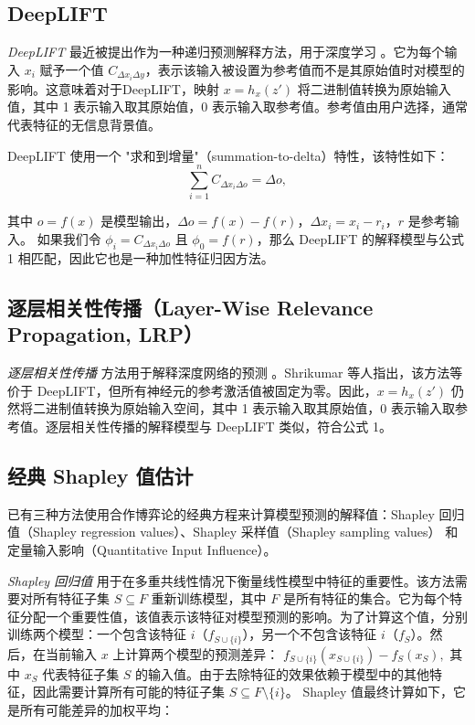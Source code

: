 \documentclass[12pt, a4paper]{ctexart} %
\begin{document}
\subsection{DeepLIFT}
\textit{DeepLIFT} 最近被提出作为一种递归预测解释方法，用于深度学习 。它为每个输入 $x_i$ 赋予一个值 $C_{\Delta x_i \Delta y}$，表示该输入被设置为参考值而不是其原始值时对模型的影响。这意味着对于DeepLIFT，映射 $x = h_x(z')$ 将二进制值转换为原始输入值，其中 1 表示输入取其原始值，0 表示输入取参考值。参考值由用户选择，通常代表特征的无信息背景值。

DeepLIFT 使用一个 "求和到增量"（summation-to-delta）特性，该特性如下：
\[
\sum_{i=1}^{n} C_{\Delta x_i \Delta o} = \Delta o,
\]

其中 $o = f(x)$ 是模型输出，$\Delta o = f(x) - f(r)$，$\Delta x_i = x_i - r_i$，$r$ 是参考输入。
如果我们令 $\phi_i = C_{\Delta x_i \Delta o}$ 且 $\phi_0 = f(r)$，那么 DeepLIFT 的解释模型与公式 1 相匹配，因此它也是一种加性特征归因方法。

\subsection{逐层相关性传播（Layer-Wise Relevance Propagation, LRP）}

\textit{逐层相关性传播} 方法用于解释深度网络的预测 \cite{lrp}。Shrikumar 等人指出，该方法等价于 DeepLIFT，但所有神经元的参考激活值被固定为零。因此，$x = h_x(z')$ 仍然将二进制值转换为原始输入空间，其中 1 表示输入取其原始值，0 表示输入取参考值。逐层相关性传播的解释模型与 DeepLIFT 类似，符合公式 1。

\subsection{经典 Shapley 值估计}
已有三种方法使用合作博弈论的经典方程来计算模型预测的解释值：Shapley 回归值（Shapley regression values）、Shapley 采样值（Shapley sampling values） 和定量输入影响（Quantitative Input Influence）。

\textit{Shapley 回归值} 用于在多重共线性情况下衡量线性模型中特征的重要性。该方法需要对所有特征子集 $S \subseteq F$ 重新训练模型，其中 $F$ 是所有特征的集合。它为每个特征分配一个重要性值，该值表示该特征对模型预测的影响。为了计算这个值，分别训练两个模型：一个包含该特征 $i$（$f_{S \cup \{i\}}$），另一个不包含该特征 $i$（$f_S$）。然后，在当前输入 $x$ 上计算两个模型的预测差异：
$
f_{S \cup \{i\}}(x_{S \cup \{i\}}) - f_S(x_S),
$
其中 $x_S$ 代表特征子集 $S$ 的输入值。由于去除特征的效果依赖于模型中的其他特征，因此需要计算所有可能的特征子集 $S \subseteq F \setminus \{i\}$。
Shapley 值最终计算如下，它是所有可能差异的加权平均：
\end{document}
